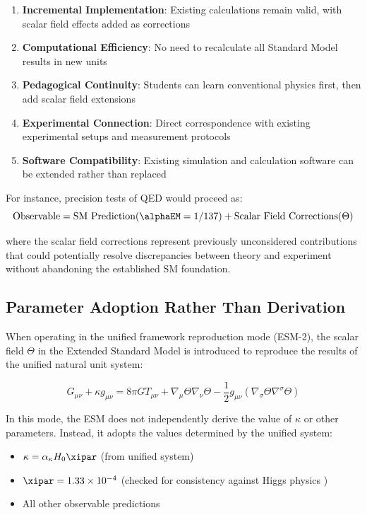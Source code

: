	\begin{enumerate}
		\item \textbf{Incremental Implementation}: Existing calculations remain valid, with scalar field effects added as corrections
		\item \textbf{Computational Efficiency}: No need to recalculate all Standard Model results in new units
		\item \textbf{Pedagogical Continuity}: Students can learn conventional physics first, then add scalar field extensions
		\item \textbf{Experimental Connection}: Direct correspondence with existing experimental setups and measurement protocols
		\item \textbf{Software Compatibility}: Existing simulation and calculation software can be extended rather than replaced
	\end{enumerate}
	
	For instance, precision tests of QED would proceed as:
	\begin{equation}
		\text{Observable} = \text{SM Prediction}(\alphaEM = 1/137) + \text{Scalar Field Corrections}(\Theta)
	\end{equation}
	
	where the scalar field corrections represent previously unconsidered contributions that could potentially resolve discrepancies between theory and experiment without abandoning the established SM foundation.
	
	\subsection{Parameter Adoption Rather Than Derivation}
	\label{subsec:parameter_adoption}
	
	When operating in the unified framework reproduction mode (ESM-2), the scalar field $\Theta$ in the Extended Standard Model is introduced to reproduce the results of the unified natural unit system:
	
	\begin{equation}
		G_{\mu\nu} + \kappa g_{\mu\nu} = 8\pi G T_{\mu\nu} + \nabla_{\mu}\Theta\nabla_{\nu}\Theta - \frac{1}{2}g_{\mu\nu}(\nabla_{\sigma}\Theta\nabla^{\sigma}\Theta)
	\end{equation}
	
	In this mode, the ESM does not independently derive the value of $\kappa$ or other parameters. Instead, it adopts the values determined by the unified system:
	
	\begin{itemize}
		\item $\kappa = \alpha_\kappa H_0 \xipar$ (from unified system)
		\item $\xipar = 1.33 \times 10^{-4}$ (checked for consistency against Higgs physics \cite{pascher_beta_derivation_2025})
		\item All other observable predictions
	\end{itemize}
	
